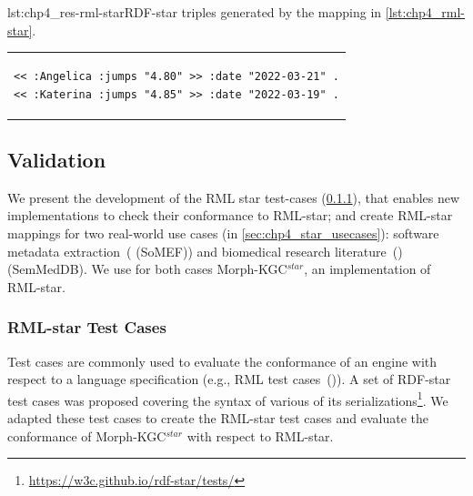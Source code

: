 \noindent\hspace{0.1\linewidth}\begin{minipage}{\linewidth}
\begin{captionedlisting}{lst:chp4_res-rml-star}{RDF-star triples generated by the mapping in \cref{lst:chp4_rml-star}.}
\centering
\begin{tabular}{c}
\hspace{2em}
{\begin{lstlisting}[basicstyle=\ttfamily\small,label={list:example1},columns=flexible]
<< :Angelica :jumps "4.80" >> :date "2022-03-21" .
<< :Katerina :jumps "4.85" >> :date "2022-03-19" .
\end{lstlisting}}
\end{tabular}
\end{captionedlisting}
\end{minipage}







\subsection{Validation}
\label{sec:chp4_validation}

We present the development of the RML star test-cases (\cref{sec:chp4_star_testcases}), that enables new implementations to check their conformance to RML-star; and create RML-star mappings for two real-world use cases (in \cref{sec:chp4_star_usecases}): software metadata extraction~(\cite{kelley2021framework} (SoMEF)) and biomedical research literature~(\cite{SemMedDB}) (SemMedDB). We use for both cases \mbox{Morph-KGC$^{star}$}, an implementation of RML-star.




\subsubsection{RML-star Test Cases}
\label{sec:chp4_star_testcases}

Test cases are commonly used %
to evaluate the conformance of an engine with respect to a language specification (e.g., RML test cases~(\cite{heyvaert2019conformance})). 
A set of \mbox{RDF-star} test cases was proposed
covering the syntax of various of its serializations\footnote{\url{https://w3c.github.io/rdf-star/tests/}}.
We adapted these test cases to create the RML-star test cases and evaluate the conformance of \mbox{Morph-KGC$^{star}$}
with respect to \mbox{RML-star}.

